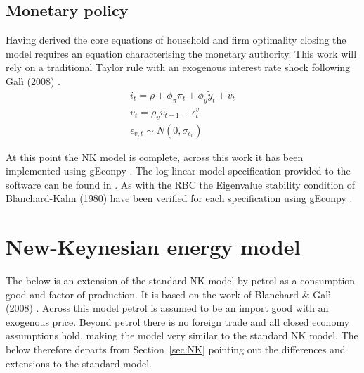 \documentclass[12pt,a4paper,english]{article} %
\let\oldsection\section
\renewcommand\section{\clearpage\oldsection}
\begin{document}
	\subsection{Monetary policy}
	Having derived the core equations of household and firm optimality closing the model requires an equation characterising the monetary authority. This work will rely on a traditional Taylor rule with an exogenous interest rate shock following Galì (2008) \cite{gali_monetary_2008}.
	\begin{equation}
		\begin{aligned}
			i_t = \rho + \phi_{\pi} \pi_t + \phi_{y} \tilde{y}_t + v_t \\
			v_t = \rho_v v_{t-1} + \epsilon_t^v \\
			\epsilon_{v,t} \sim N(0, \sigma_{\epsilon_v})
		\end{aligned}
	\end{equation}
	
	At this point the NK model is complete, across this work it has been implemented using gEconpy \cite{jessegrabowski_geconpy_2023}. The log-linear model specification provided to the software can be found in . As with the RBC the Eigenvalue stability condition of Blanchard-Kahn (1980) have been verified for each specification using gEconpy \cite{blanchard_solution_1980}.

	\section{New-Keynesian energy model}
	The below is an extension of the standard NK model by petrol as a consumption good and factor of production. It is based on the work of Blanchard \& Galì (2008) \cite{blanchard_macroeconomic_2007}. Across this model petrol is assumed to be an import good with an exogenous price. Beyond petrol there is no foreign trade and all closed economy assumptions hold, making the model very similar to the standard NK model. The below therefore departs from Section~\ref{sec:NK} pointing out the differences and extensions to the standard model.
	
\end{document}
